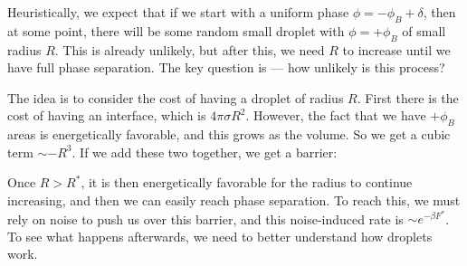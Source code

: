 \documentclass[a4paper]{article}
\begin{document}
Heuristically, we expect that if we start with a uniform phase $\phi = -\phi_B + \delta$, then at some point, there will be some random small droplet with $\phi = +\phi_B$ of small radius $R$. This is already unlikely, but after this, we need $R$ to increase until we have full phase separation. The key question is --- how unlikely is this process?
\begin{center}
\end{center}
The idea is to consider the cost of having a droplet of radius $R$. First there is the cost of having an interface, which is $4 \pi \sigma R^2$. However, the fact that we have $+\phi_B$ areas is energetically favorable, and this grows as the volume. So we get a cubic term $\sim -R^3$. If we add these two together, we get a barrier:
\begin{center}
\end{center}
Once $R > R^*$, it is then energetically favorable for the radius to continue increasing, and then we can easily reach phase separation. To reach this, we must rely on noise to push us over this barrier, and this noise-induced rate is $\sim e^{-\beta F^*}$. To see what happens afterwards, we need to better understand how droplets work.
\end{document}
